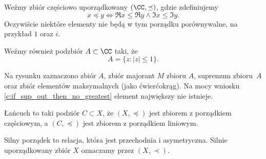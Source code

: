 \begin{example}
    Weźmy zbiór częściowo uporządkowany $(\CC, \preceq)$, gdzie zdefiniujemy
    $$ x \preceq y \iff \Re{x} \leq \Re{y} \wedge \Im{x} \leq \Im{y}. $$
    Oczywiście niektóre elementy nie będą w tym porządku porównywalne, na przykład $1$ oraz $i$.

    Weźmy również podzbiór $A \subset \CC$ taki, że
    $$ A = \{z : |z| \leq 1\}. $$

    Na rysunku zaznaczono \textcolor{MainColor1}{zbiór $A$}, \textcolor{LinkColor1}{zbiór majorant $M$ zbioru $A$}, \textcolor{BoxColor1}{supremum zbioru~$A$} oraz \textcolor{MainColor1}{zbiór elementów maksymalnych} (jako ćwierćokrąg). Na mocy wniosku \ref{c:if_sup_out_then_no_greatest} element największy nie istnieje.

    \begin{center}
    \end{center}
\end{example}

\begin{definition}
    Łańcuch to taki podziór $C \subset X$, że $(X, \preceq)$ jest zbiorem z porządkiem częściowym, a $(C, \preceq)$ jest zbiorem z porządkiem liniowym.
\end{definition}

\begin{definition}
    Silny porządek to relacja, która jest przechodnia i asymetryczna. Silnie uporządkowany zbiór $X$ oznaczamy przez $(X, \prec)$.
\end{definition}